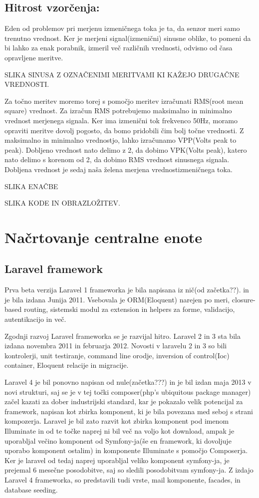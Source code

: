 \documentclass[12pt,a4paper,titlepage,openany]{report}
\begin{document}
\subsection{Hitrost vzorčenja:}
Eden od problemov pri merjenu izmeničnega toka je ta, da senzor meri samo trenutno vrednost. Ker je merjeni signal(izmenični) sinusne oblike, to pomeni da bi lahko za enak porabnik, izmeril več različnih vrednosti, odvisno od časa opravljene meritve.

SLIKA SINUSA Z OZNAČENIMI MERITVAMI KI KAŽEJO DRUGAČNE VREDNOSTI.

Za točno meritev moremo torej s pomočjo meritev izračunati RMS(root mean square) vrednost. Za izračun RMS potrebujemo maksimalno in minimalno vrednost merjenega signala. Ker ima izmenični tok frekvenco 50Hz, moramo opraviti meritve dovolj pogosto, da bomo pridobili čim bolj točne vrednosti. Z maksimalno in minimalno vrednostjo, lahko izračunamo VPP(Volts peak to peak). Dobljeno vrednost nato delimo z 2, da dobimo VPK(Volts peak), katero nato delimo s korenom od 2, da dobimo RMS vrednost sinusnega signala. Dobljena vrednost je sedaj naša želena merjena vrednostizmeničnega toka.

SLIKA ENAČBE

SLIKA KODE IN OBRAZLOŽITEV.


\section{Načrtovanje centralne enote}
\thispagestyle{fancy}



\subsection{Laravel framework}
Prva beta verzija Laravel 1 frameworka je bila napisana iz nič(od začetka??). in je bila izdana Junija 2011. Vsebovala je ORM(Eloquent) narejen po meri, closure-based routing, sistemski modul za extension in helpers za forme, validacijo, autentikacijo in več.

Zgodnji razvoj Laravel frameworka se je razvijal hitro. Laravel 2 in 3 sta bila izdana novembra 2011 in februarja 2012. Novosti v laravelu 2 in 3 so bili kontrolerji, unit testiranje, command line orodje, inversion of control(Ioc) container, Eloquent relacije in migracije.

Laravel 4 je bil ponovno napisan od nule(začetka???) in je bil izdan maja 2013 v novi strukturi, saj se je v tej točki composer(php's ubiquitous package manager) začel kazati za dober industrijski standard, kar je pokazalo velik potencijal za framework, napisan kot zbirka komponent, ki je bila povezana med seboj s strani kompozerja. Laravel je bil zato razvit kot zbirka komponent pod imenom Illuminate in od te točke naprej ni bil več na voljo kot download, ampak je uporabljal večino komponent od Symfony-ja(še en framework, ki dovoljuje uporabo komponent ostalim) in komponente Illuminate s pomočjo Composerja. Ker je laravel od tedaj naprej uporabljal veliko komponent symfony-ja, je prejemal 6 mesečne posodobitve, saj so sledili posodobitvam symfony-ja. Z izdajo Laravel 4 frameworka, so predstavili tudi vrste, mail komponente, facades, in database seeding.
\end{document}

